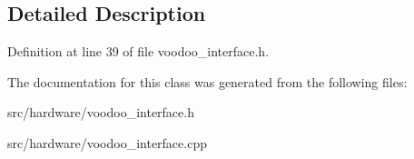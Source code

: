 \subsection{Detailed Description}


Definition at line 39 of file voodoo\-\_\-interface.\-h.



The documentation for this class was generated from the following files\-:\begin{DoxyCompactItemize}
\item 
src/hardware/voodoo\-\_\-interface.\-h\item 
src/hardware/voodoo\-\_\-interface.\-cpp\end{DoxyCompactItemize}
